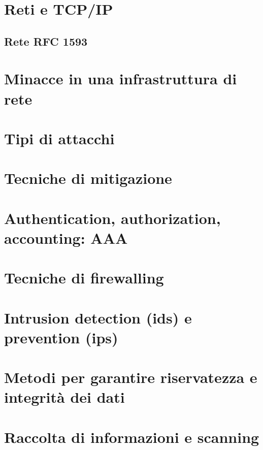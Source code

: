 \appendix

\chapter{Reti e TCP/IP}                                                 %
\section{Rete RFC 1593}

\chapter{Minacce in una infrastruttura di rete}                         %

\chapter{Tipi di attacchi}                                              %

\chapter{Tecniche di mitigazione}                                       %

\chapter{Authentication, authorization, accounting: AAA}                %

\chapter{Tecniche di firewalling}                                       %

\chapter{Intrusion detection (ids) e prevention (ips)}                  %
 
\chapter{Metodi per garantire riservatezza e integrità dei dati} 		%
  
\chapter{Raccolta di informazioni e scanning} 							%
   
